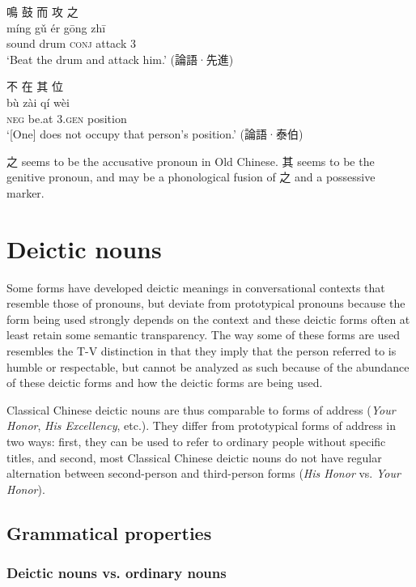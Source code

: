 \documentclass[UTF8, a4paper, oneside, scheme=plain, 12pt]{ctexrep}
\newcommand{\form}[1]{\emph{#1}}
\newcommand{\translate}[1]{`#1'}
\newcommand*{\category}[1]{\textsc{#1}}
\begin{document}
\begin{exe}
    \ex\label{ex:pronoun.personal.third.zhi.1}
    \glll 鳴 鼓 而 攻 之 \\
    míng gǔ ér gōng zhī \\
    sound drum \category{conj} attack 3 \\
    \glt\translate{Beat the drum and attack him.} \hfill (論語·先進)

    \ex\label{ex:pronoun.personal.third.qi.1}
    \glll 不 在 其 位 \\
    bù zài qí wèi \\
    \category{neg} be.at 3.\category{gen} position \\
    \glt\translate{[One] does not occupy that person's position.} \hfill (論語·泰伯)
\end{exe}

之 seems to be the accusative pronoun in Old Chinese.
其 seems to be the genitive pronoun,
and may be a phonological fusion of 之 and a possessive marker.

\section{Deictic nouns}

Some forms have developed deictic meanings in conversational contexts that resemble those of pronouns,
but deviate from prototypical pronouns because the form being used strongly depends on the context 
and these deictic forms often at least retain some semantic transparency.
The way some of these forms are used resembles the T-V distinction in that they imply that the person referred to is humble or respectable,
but cannot be analyzed as such because of the abundance of these deictic forms and how the deictic forms are being used.

Classical Chinese deictic nouns are thus comparable to forms of address (\form{Your Honor}, \form{His Excellency}, etc.).
They differ from prototypical forms of address in two ways: first, they can be used to refer to ordinary people without specific titles, and second, most Classical Chinese deictic nouns do not have regular alternation between second-person and third-person forms (\form{His Honor} vs. \form{Your Honor}).

\subsection{Grammatical properties}

\subsubsection{Deictic nouns vs. ordinary nouns}
\end{document}
